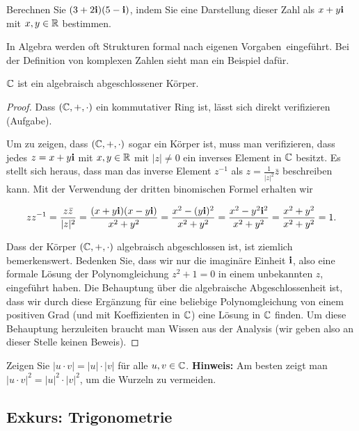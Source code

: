\begin{aufg}
	Berechnen Sie $(3+ 2 \mathbf{i}) ( 5 - \mathbf{i})$, indem Sie eine Darstellung dieser Zahl als $x+y \mathbf{i}$ mit $x, y \in \mathbb{R}$ bestimmen. 
\end{aufg} 

\begin{bem}
	In Algebra werden oft Strukturen formal nach \glqq eigenen Vorgaben\grqq\ eingeführt. Bei der Definition von komplexen Zahlen sieht man ein Beispiel dafür. 
\end{bem} 

\begin{thm}
		$\mathbb{C}$ ist ein algebraisch abgeschlossener Körper. 
\end{thm}
\begin{proof} 
	Dass $(\mathbb{C},+,\cdot)$ ein kommutativer Ring ist, lässt sich direkt verifizieren (Aufgabe). 
	
	Um zu zeigen, dass $(\mathbb{C},+,\cdot)$ sogar ein Körper ist, muss man verifizieren, dass jedes $z = x + y \mathbf{i}$ mit $x, y \in \mathbb{R}$ mit $|z| \ne 0$ ein inverses Element in $\mathbb{C}$ besitzt. Es stellt sich heraus, dass man das inverse Element $z^{-1}$ als $z = \frac{1}{|z|^2} \bar{z}$ beschreiben kann. Mit der Verwendung der dritten binomischen Formel erhalten wir 
	
	\[
		 	z z^{-1} = \frac{z \bar{z} }{|z|^2} = \frac{ ( x+ y \mathbf{i}) ( x - y\mathbf{i}) }{x^2 + y^2}   = \frac{ x^2 - (y \mathbf{i})^2 }{x^2 + y^2} = \frac{x^2 - y^2 \mathbf{i}^2}{x^2 + y^2} = \frac{x^2 + y^2}{x^2 + y^2} = 1. 
	\]
	
	Dass der Körper $(\mathbb{C},+,\cdot)$ algebraisch abgeschlossen ist, ist ziemlich bemerkenswert. Bedenken Sie, dass wir nur die imaginäre Einheit $\mathbf{i}$, also eine formale Lösung der Polynomgleichung $z^2 + 1=0$ in einem unbekannten $z$, eingeführt haben. Die Behauptung über die algebraische Abgeschlossenheit ist, dass wir durch diese Ergänzung für eine beliebige Polynomgleichung von einem positiven Grad (und mit Koeffizienten in $\mathbb{C}$) eine Lösung in $\mathbb{C}$ finden. Um diese Behauptung herzuleiten braucht man Wissen aus der Analysis (wir geben also an dieser Stelle keinen Beweis). 
\end{proof} 

\begin{aufg}
	Zeigen Sie $|u \cdot v| = |u| \cdot |v|$ für alle $u, v \in \mathbb{C}$. \textbf{Hinweis:} Am besten zeigt man $|u \cdot v|^2 = |u|^2  \cdot |v|^2$, um die Wurzeln zu vermeiden. 
\end{aufg} 

\subsection{Exkurs: Trigonometrie} 

